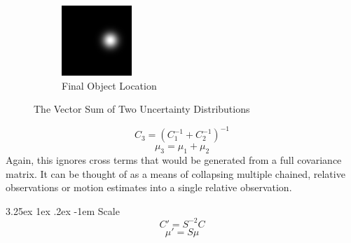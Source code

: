 \documentclass{article}
\makeatletter
\renewcommand\paragraph{\@startsection{paragraph}{5}{\z@}%
  {3.25ex \@plus1ex \@minus.2ex}%
  {-1em}%
  {\normalfont\normalsize\bfseries}}
\makeatother
\begin{document}
\begin{figure}
\begin{subfigure}{.3\textwidth}
        \end{subfigure}
        \begin{subfigure}{.3\textwidth}
          \centering
          \includegraphics[width=.8\linewidth]{images/GaussianSum3.png}
          \caption{Final Object Location}
          \label{fig:vectSumsub3}
        \end{subfigure}
        \caption{The Vector Sum of Two Uncertainty Distributions}
        \label{fig:vectSum}
        \end{figure}
        \begin{equation}
        C_3 = (C_1^{-1} + C_2^{-1})^{-1}
        \end{equation}
        \begin{equation}
        \mu_3 = \mu_1 + \mu_2
        \end{equation}
        Again, this ignores cross terms that would be generated from a full covariance matrix.  It can be thought of as a means of collapsing multiple chained, relative observations or motion estimates into a single relative observation.

        \paragraph{Scale}
        \begin{equation}
        C' = S^{-2} C
        \end{equation}
        \begin{equation}
        \mu' = S \mu
        \end{equation}
\end{document}
